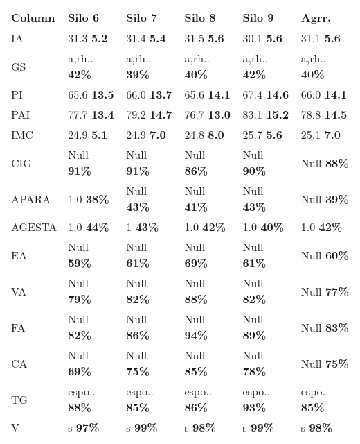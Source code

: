 \begin{tabular}{l|lllll}
\toprule
   Column &               Silo 6 &               Silo 7 &               Silo 8 &               Silo 9 &                Agrr. \\
\midrule
       IA &    31.3 \textbf{5.2} &    31.4 \textbf{5.4} &    31.5 \textbf{5.6} &    30.1 \textbf{5.6} &    31.1 \textbf{5.6} \\
       GS & a,rh.. \textbf{42\%} & a,rh.. \textbf{39\%} & a,rh.. \textbf{40\%} & a,rh.. \textbf{42\%} & a,rh.. \textbf{40\%} \\
       PI &   65.6 \textbf{13.5} &   66.0 \textbf{13.7} &   65.6 \textbf{14.1} &   67.4 \textbf{14.6} &   66.0 \textbf{14.1} \\
      PAI &   77.7 \textbf{13.4} &   79.2 \textbf{14.7} &   76.7 \textbf{13.0} &   83.1 \textbf{15.2} &   78.8 \textbf{14.5} \\
      IMC &    24.9 \textbf{5.1} &    24.9 \textbf{7.0} &    24.8 \textbf{8.0} &    25.7 \textbf{5.6} &    25.1 \textbf{7.0} \\
      CIG &   Null \textbf{91\%} &   Null \textbf{91\%} &   Null \textbf{86\%} &   Null \textbf{90\%} &   Null \textbf{88\%} \\
    APARA &    1.0 \textbf{38\%} &   Null \textbf{43\%} &   Null \textbf{41\%} &   Null \textbf{43\%} &   Null \textbf{39\%} \\
   AGESTA &    1.0 \textbf{44\%} &      1 \textbf{43\%} &    1.0 \textbf{42\%} &    1.0 \textbf{40\%} &    1.0 \textbf{42\%} \\
       EA &   Null \textbf{59\%} &   Null \textbf{61\%} &   Null \textbf{69\%} &   Null \textbf{61\%} &   Null \textbf{60\%} \\
       VA &   Null \textbf{79\%} &   Null \textbf{82\%} &   Null \textbf{88\%} &   Null \textbf{82\%} &   Null \textbf{77\%} \\
       FA &   Null \textbf{82\%} &   Null \textbf{86\%} &   Null \textbf{94\%} &   Null \textbf{89\%} &   Null \textbf{83\%} \\
       CA &   Null \textbf{69\%} &   Null \textbf{75\%} &   Null \textbf{85\%} &   Null \textbf{78\%} &   Null \textbf{75\%} \\
       TG & espo.. \textbf{88\%} & espo.. \textbf{85\%} & espo.. \textbf{86\%} & espo.. \textbf{93\%} & espo.. \textbf{85\%} \\
        V &      s \textbf{97\%} &      s \textbf{99\%} &      s \textbf{98\%} &      s \textbf{99\%} &      s \textbf{98\%} \\

\end{tabular}
